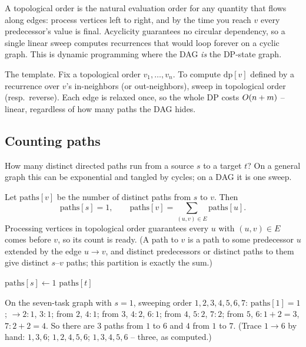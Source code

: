 A topological order is the natural evaluation order for any quantity that flows
along edges: process vertices left to right, and by the time you reach $v$ every predecessor's value
is final. Acyclicity guarantees no circular dependency, so a single linear sweep computes recurrences
that would loop forever on a cyclic graph. This is dynamic programming where the DAG \emph{is} the
DP-state graph.

\begin{focusbox}
The template. Fix a topological order $v_1,\dots,v_n$. To compute $\mathrm{dp}[v]$ defined by a
recurrence over $v$'s in-neighbors (or out-neighbors), sweep in topological order (resp.\ reverse).
Each edge is relaxed once, so the whole DP costs $O(n+m)$ -- linear, regardless of how many paths
the DAG hides.
\end{focusbox}

\subsection{Counting paths}

How many distinct directed paths run from a source $s$ to a target $t$? On a general graph this can be
exponential and tangled by cycles; on a DAG it is one sweep.

Let $\mathrm{paths}[v]$ be the number of distinct paths from $s$ to $v$. Then
\[
  \mathrm{paths}[s]=1,\qquad \mathrm{paths}[v]=\sum_{(u,v)\in E}\mathrm{paths}[u].
\]
Processing vertices in topological order guarantees every $u$ with $(u,v)\in E$ comes before $v$, so
its count is ready. (A path to $v$ is a path to some predecessor $u$ extended by the edge $u\to v$,
and distinct predecessors or distinct paths to them give distinct $s$--$v$ paths; this partition is
exactly the sum.)

\begin{algorithm}[H]
\DontPrintSemicolon
{}
$\mathrm{paths}[s]\gets 1$\;
\Return $\mathrm{paths}[t]$\;
\caption{\textsc{CountPaths}$(\Gph,s,t)$}\label{ch04:countpaths}
\end{algorithm}

On the seven-task graph with $s=1$, sweeping order $1,2,3,4,5,6,7$:
$\mathrm{paths}[1]=1$; $\to 2{:}1$, $3{:}1$; from $2$, $4{:}1$; from $3$, $4{:}2$, $6{:}1$; from $4$,
$5{:}2$, $7{:}2$; from $5$, $6{:}1{+}2{=}3$, $7{:}2{+}2{=}4$. So there are $3$ paths from $1$ to $6$
and $4$ from $1$ to $7$. (Trace $1\!\to\!6$ by hand: $1{,}3{,}6$; $1{,}2{,}4{,}5{,}6$;
$1{,}3{,}4{,}5{,}6$ -- three, as computed.)

